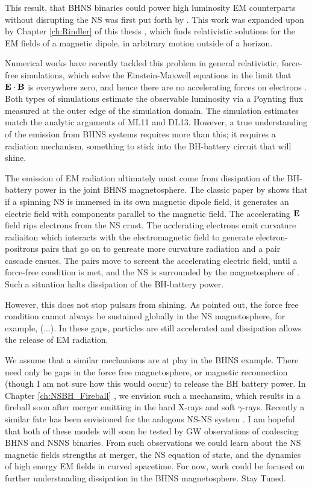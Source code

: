 This result, that BHNS binaries could power high luminosity EM counterparts
without disrupting the NS was first put forth by \cite[][]{McL:2011}. This
work was expanded upon by Chapter \ref{ch:Rindler} of this thesis
\cite[][]{DL:2013}, which finds relativistic solutions for the EM fields of
a magnetic dipole, in arbitrary motion outside of a horizon.

Numerical works have recently tackled this problem in general relativistic,
force-free simulations, which solve the Einstein-Maxwell equations in the
limit that ${\bf E} \cdot {\bf B}$ is everywhere zero, and hence there are no
accelerating forces on electrons \citep{Paschalidis:2013}. Both types of
simulations estimate the observable luminosity via a Poynting flux measured at
the outer edge of the simulation domain. The simulation estimates match the
analytic arguments of ML11 and DL13. However, a true understanding of the
emission from BHNS systems requires more than this; it requires a radiation
mechanism, something to stick into the BH-battery circuit that will shine.

The emission of EM radiation ultimately must come from dissipation of the BH-
battery power in the joint BHNS magnetosphere. The classic paper by
\cite{GJ:1969} shows that if a spinning NS is immersed in its own magnetic
dipole field, it generates an electric field with components parallel to the
magnetic field. The accelerating ${\bf E}$ field rips electrons from the NS
crust. The acclerating electrons emit curvature radiaiton which interacts with
the electromagnetic field to generate electron-positrons pairs that go on to
genreate more curvature radiation and a pair cascade ensues. The pairs move to
screent the accelerating electric field, until a force-free condition is met,
and the NS is surrounded by the magnetosphere of \citep{GJ:1969}. Such a
situation halts dissipation of the BH-battery power.

However, this does not stop pulsars from shining. As \citep{RudSuth:1975}
pointed out, the force free condition cannot always be sustained globally in
the NS magnetosphere, for example, (...). In these gaps, particles are still
accelerated and dissipation allows the release of EM radiation.

We assume that a similar mechanisms are at play in the BHNS example. There need
only be gaps in the force free magnetosphere, or magnetic reconnection (though
I am not sure how this would occur) to release the BH battery power. In
Chapter \ref{ch:NSBH_Fireball} \citep{DL:2016}, we envision such a mechansim,
which results in a fireball soon after merger emitting in the hard X-rays and
soft $\gamma$-rays. Recently a similar fate has been envisioned for the
anlogous NS-NS system \citep{MetzgerNSNS:2016}. I am hopeful that both of
these models will soon be tested by GW observations of coalescing BHNS and
NSNS binaries. From such observations we could learn about the NS magnetic fields strengths at merger, the NS equation of state, and the dynamics of high energy EM fields in curved spacetime. For now, work could be focused on further understnading dissipation in the BHNS magnetosphere. Stay Tuned.



